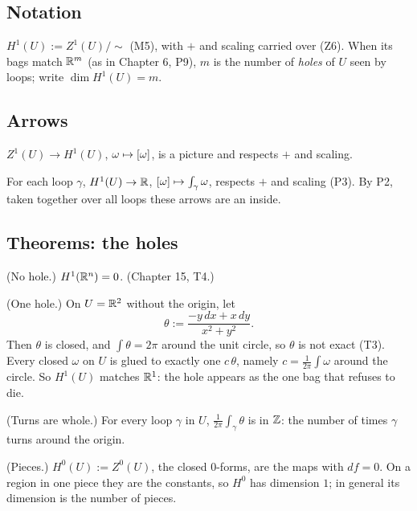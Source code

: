 \subsection*{Notation}

\begin{lines}
\item[\lab{N1}] $H^1(U) := Z^1(U)/{\sim}$ (M5), with $+$ and scaling carried over (Z6). When its bags match $\mathbb{R}^m$ (as in Chapter 6, P9), $m$ is the number of \emph{holes} of $U$ seen by loops; write $\dim H^1(U) = m$.
\end{lines}

\subsection*{Arrows}

\begin{lines}
\item[\lab{P5}] $Z^1(U) \to H^1(U)$, $\omega \mapsto [\omega]$, is a picture and respects $+$ and scaling.
\item[\lab{P6}] For each loop $\gamma$, $H^1(U) \to \mathbb{R}$, $[\omega] \mapsto \int_\gamma \omega$, respects $+$ and scaling (P3). By P2, taken together over all loops these arrows are an inside.
\end{lines}

\subsection*{Theorems: the holes}

\begin{lines}
\item[\lab{T4}] (No hole.) $H^1(\mathbb{R}^n) = 0$. (Chapter 15, T4.)
\item[\lab{T5}] (One hole.) On $U = \mathbb{R}^2$ without the origin, let
\[
\theta := \frac{-y\,dx + x\,dy}{x^2 + y^2}.
\]
Then $\theta$ is closed, and $\int \theta = 2\pi$ around the unit circle, so $\theta$ is not exact (T3). Every closed $\omega$ on $U$ is glued to exactly one $c\,\theta$, namely $c = \tfrac{1}{2\pi} \int \omega$ around the circle. So $H^1(U)$ matches $\mathbb{R}^1$: the hole appears as the one bag that refuses to die.
\item[\lab{T6}] (Turns are whole.) For every loop $\gamma$ in $U$, $\tfrac{1}{2\pi} \int_\gamma \theta$ is in $\mathbb{Z}$: the number of times $\gamma$ turns around the origin.
\item[\lab{T7}] (Pieces.) $H^0(U) := Z^0(U)$, the closed $0$-forms, are the maps with $df = 0$. On a region in one piece they are the constants, so $H^0$ has dimension $1$; in general its dimension is the number of pieces.
\end{lines}

